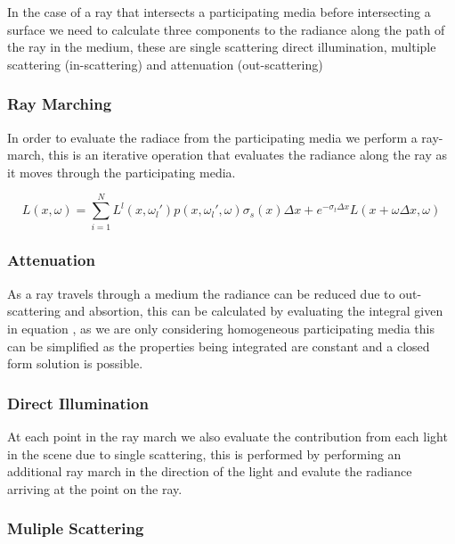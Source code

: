 In the case of a ray that intersects a participating media before intersecting a surface we need to calculate three components to
the radiance along the path of the ray in the medium, these are single scattering direct illumination, multiple scattering (in-scattering)
and attenuation (out-scattering)

\subsubsection{Ray Marching}
In order to evaluate the radiace from the participating media we perform a ray-march, this is an iterative operation that evaluates the
radiance along the ray as it moves through the participating media.

\begin{equation}
L(x, \omega) = \sum\limits_{i = 1}^N L^l(x, \omega_l')p(x, \omega_l', \omega)\sigma_s(x)\Delta x + e^{- \sigma_t \Delta x} L (x + \omega \Delta x, \omega)
\end{equation}

\subsubsection{Attenuation}
As a ray travels through a medium the radiance can be reduced due to out-scattering and absortion, this can be calculated by evaluating
the integral given in equation , as we are only considering homogeneous participating media this can be
simplified as the properties being integrated are constant and a closed form solution is possible.


\subsubsection{Direct Illumination}
At each point in the ray march we also evaluate the contribution from each light in the scene due to single scattering, this is performed
by performing an additional ray march in the direction of the light and evalute the radiance arriving at the point on the ray.

\subsubsection{Muliple Scattering}

